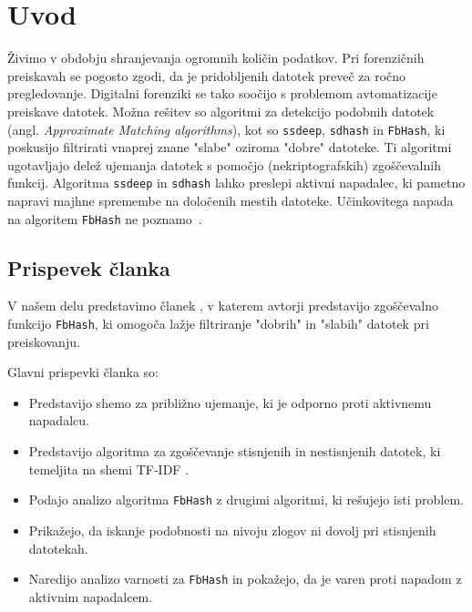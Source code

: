\documentclass{acm_proc_article-sp}
\begin{document}


\section{Uvod}
Živimo v obdobju shranjevanja ogromnih količin podatkov. Pri forenzičnih preiskavah se pogosto zgodi, da je pridobljenih datotek preveč za ročno pregledovanje. Digitalni forenziki se tako soočijo s problemom avtomatizacije preiskave datotek. Možna rešitev so algoritmi za detekcijo podobnih datotek (angl. \emph{Approximate Matching algorithms}), kot so \texttt{ssdeep}, \texttt{sdhash} in \texttt{FbHash}, ki poskusijo filtrirati vnaprej znane "slabe" oziroma "dobre" datoteke. Ti algoritmi ugotavljajo delež ujemanja datotek s pomočjo (nekriptografskih) zgoščevalnih funkcij. Algoritma \texttt{ssdeep} in \texttt{sdhash} lahko preslepi aktivni napadalec, ki pametno napravi majhne spremembe na določenih mestih datoteke. Učinkovitega napada na algoritem \texttt{FbHash} ne poznamo~\cite{fbhash}.

\subsection{Prispevek \v{c}lanka}

V našem delu predstavimo članek \cite{fbhash}, v katerem avtorji predstavijo zgoščevalno funkcijo \texttt{FbHash}, ki omogoča lažje filtriranje "dobrih" in "slabih" datotek pri preiskovanju. 

Glavni prispevki članka \cite{fbhash} so:
\begin{itemize}
  \item Predstavijo shemo za približno ujemanje, ki je odporno proti aktivnemu napadalcu.
  \item Predstavijo algoritma za zgoščevanje stisnjenih in nestisnjenih datotek, ki temeljita na shemi TF-IDF \cite{Ramos_usingtf-idf}.
  \item Podajo analizo algoritma \texttt{FbHash} z drugimi algoritmi, ki rešujejo isti problem.
  \item Prikažejo, da iskanje podobnosti na nivoju zlogov ni dovolj pri stisnjenih datotekah.
  \item Naredijo analizo varnosti za \texttt{FbHash} in pokažejo, da je varen proti napadom z aktivnim napadalcem.
\end{itemize}
\end{document}
